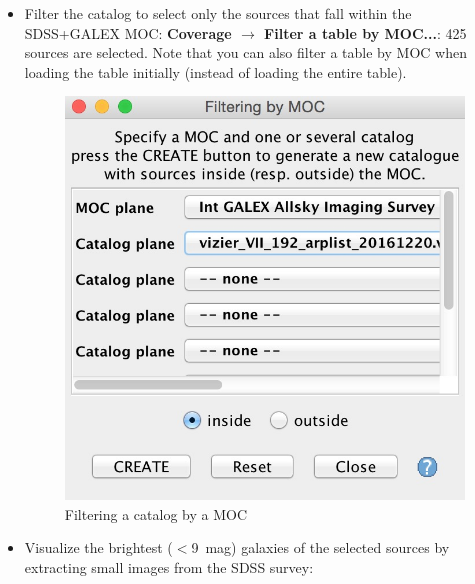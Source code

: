 \documentclass [a4paper, 12pt]{article}
\begin{document}
\begin{itemize}
    \item Filter the catalog to select only the sources that fall within 
the SDSS+GALEX MOC: \textbf{Coverage $\rightarrow$ Filter a table by 
MOC...}: 425 sources are selected. Note that you can also filter a table by MOC 
when loading the table initially (instead of loading the entire table). 
\begin{figure}[H]
\center
\includegraphics[width=0.4 
\textwidth]{../images/aladin_moc_filter-tab-by-moc.jpg}
\caption{Filtering a catalog by a MOC}
\label{fig:filtermoc}
\end{figure}

    \item Visualize the brightest ($<$9~mag) galaxies of the selected 
sources by extracting small images from the SDSS survey:


\end{itemize}
\end{document}
